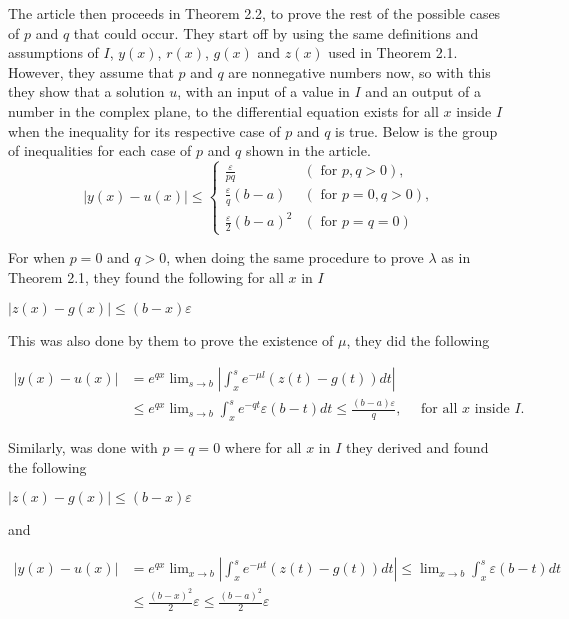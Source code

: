 \documentclass[mla9]{mla}
\begin{document}
\begin{paper}
The article then proceeds in Theorem 2.2, to prove the rest of the possible cases of $p$ and $q$ that could occur. They start off by using the same definitions and assumptions of $I$, $y(x)$, $r(x)$, $g(x)$ and $z(x)$ used in Theorem 2.1. However, they assume that $p$ and $q$ are nonnegative numbers now, so with this they show that a solution $u$, with an input of a value in $I$ and an output of a number in the complex plane, to the differential equation exists for all $x$ inside $I$ when the inequality for its respective case of $p$ and $q$ is true. Below is the group of inequalities for each case of $p$ and $q$ shown in the article.
$$
|y(x)-u(x)| \leq \begin{cases}\frac{\varepsilon}{p q} & (\text { for } p, q>0), \\ \frac{\varepsilon}{q}(b-a) & (\text { for } p=0, q>0), \\ \frac{\varepsilon}{2}(b-a)^2 & (\text { for } p=q=0)\end{cases}
$$

For when $p = 0$ and $q > 0$, when doing the same procedure to prove $\lambda$ as in Theorem 2.1, they found the following for all $x$ in $I$
\begin{center}
    $|z(x)-g(x)| \leq(b-x) \varepsilon$
\end{center}
This was also done by them to prove the existence of $\mu$, they did the following

\begin{center}
    $\begin{aligned}|y(x)-u(x)| & =e^{q x} \lim _{s \rightarrow b}\left|\int_x^s e^{-\mu l}(z(t)-g(t)) d t\right| \\ & \leq e^{q x} \lim _{s \rightarrow b} \int_x^s e^{-q t} \varepsilon(b-t) d t \leq \frac{(b-a) \varepsilon}{q}, \quad \text { for all } x \text{ inside } I .\end{aligned}$
\end{center}
Similarly, was done with $p=q=0$ where for all $x$ in $I$ they derived and found the following
\begin{center}
    $|z(x)-g(x)| \leq(b-x) \varepsilon$
\end{center}
and
\begin{center}
    $\begin{aligned}|y(x)-u(x)| & =e^{q x} \lim _{x \rightarrow b}\left|\int_x^s e^{-\mu t}(z(t)-g(t)) d t\right| \leq \lim _{x \rightarrow b} \int_x^s \varepsilon(b-t) d t \\ & \leq \frac{(b-x)^2}{2} \varepsilon \leq \frac{(b-a)^2}{2} \varepsilon\end{aligned}$
\end{center}


\end{paper}
\end{document}
